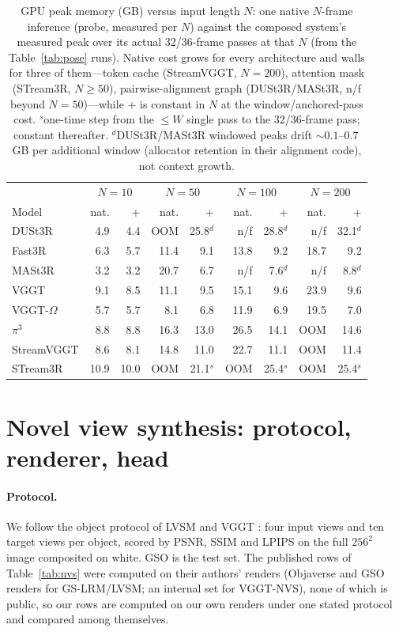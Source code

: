 \begin{table}[h]
\centering\scriptsize
\setlength{\tabcolsep}{4pt}
\caption{GPU peak memory (GB) versus input length $N$: one native
$N$-frame inference (probe, measured per $N$) against the composed
system's measured peak over its actual 32/36-frame passes at that $N$
(from the Table~\ref{tab:pose} runs). Native cost grows for every
architecture and walls for three of them---token cache (StreamVGGT,
$N{=}200$), attention mask (STream3R, $N{\ge}50$), pairwise-alignment
graph (DUSt3R/MASt3R, n/f beyond $N{=}50$)---while +\smr{} is constant
in $N$ at the window/anchored-pass cost. $^{s}$one-time step from the
${\le}W$ single pass to the 32/36-frame pass; constant thereafter.
$^{d}$DUSt3R/MASt3R windowed peaks drift ${\sim}0.1$--$0.7$\,GB per
additional window (allocator retention in their alignment code), not
context growth.}
\label{tab:memvsn}
\begin{tabular}{@{}l rr rr rr rr@{}}
\toprule
 & \multicolumn{2}{c}{$N{=}10$} & \multicolumn{2}{c}{$N{=}50$}
 & \multicolumn{2}{c}{$N{=}100$} & \multicolumn{2}{c}{$N{=}200$} \\
Model & nat. & +\smr{} & nat. & +\smr{} & nat. & +\smr{} & nat. & +\smr{} \\
\midrule
DUSt3R & 4.9 & 4.4 & OOM & 25.8$^{d}$ & n/f & 28.8$^{d}$ & n/f & 32.1$^{d}$ \\
Fast3R & 6.3 & 5.7 & 11.4 & 9.1 & 13.8 & 9.2 & 18.7 & 9.2 \\
MASt3R & 3.2 & 3.2 & 20.7 & 6.7 & n/f & 7.6$^{d}$ & n/f & 8.8$^{d}$ \\
VGGT & 9.1 & 8.5 & 11.1 & 9.5 & 15.1 & 9.6 & 23.9 & 9.6 \\
VGGT-$\Omega$ & 5.7 & 5.7 & 8.1 & 6.8 & 11.9 & 6.9 & 19.5 & 7.0 \\
$\pi^3$ & 8.8 & 8.8 & 16.3 & 13.0 & 26.5 & 14.1 & OOM & 14.6 \\
StreamVGGT & 8.6 & 8.1 & 14.8 & 11.0 & 22.7 & 11.1 & OOM & 11.4 \\
STream3R & 10.9 & 10.0 & OOM & 21.1$^{s}$ & OOM & 25.4$^{s}$ & OOM & 25.4$^{s}$ \\
\bottomrule
\end{tabular}
\end{table}

\section{Novel view synthesis: protocol, renderer, head}
\label{app:nvs}
\paragraph{Protocol.} We follow the object protocol of LVSM \citep{lvsm} and
VGGT \citep{vggt}: four input views and ten target views per object, scored by
PSNR, SSIM and LPIPS \citep{lpips} on the full $256^2$ image composited on
white. GSO \citep{gso} is the test set. The published rows of
Table~\ref{tab:nvs} were computed on their authors' renders (Objaverse and GSO
renders for GS-LRM/LVSM; an internal set for VGGT-NVS), none of which is
public, so our rows are computed on our own renders under one stated protocol
and compared among themselves.

